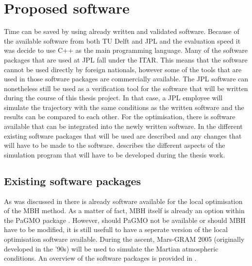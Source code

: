 \chapter{Proposed software} %
\label{ch:software}
Time can be saved by using already written and validated software. Because of the available software from both TU Delft and \ac{JPL} and the evaluation speed it was decide to use C++ as the main programming language. Many of the software packages that are used at \ac{JPL} fall under the \ac{ITAR}. This means that the software cannot be used directly by foreign nationals, however some of the tools that are used in those software packages are commercially available. The \ac{JPL} software can nonetheless still be used as a verification tool for the software that will be written during the course of this thesis project. In that case, a \ac{JPL} employee will simulate the trajectory with the same conditions as the written software and the results can be compared to each other. For the optimisation, there is software available that can be integrated into the newly written software. In  the different existing software packages that will be used are described and any changes that will have to be made to the software.  describes the different aspects of the simulation program that will have to be developed during the thesis work.

\section{Existing software packages}
\label{sec:ex_soft}
As was discussed in  there is already software available for the local optimisation of the \ac{MBH} method. As a matter of fact, \ac{MBH} itself is already an option within the \ac{PaGMO} package \cite{izzo2012pygmo,boudestijn2014}. However, should \ac{PaGMO} not be available or should \ac{MBH} have to be modified, it is still usefull to have a seperate version of the local optimisation software available. During the ascent, Mars-\ac{GRAM} 2005 (originally developed in the '90s) will be used to simulate the Martian atmospheric conditions.  An overview of the software packages is provided in .


